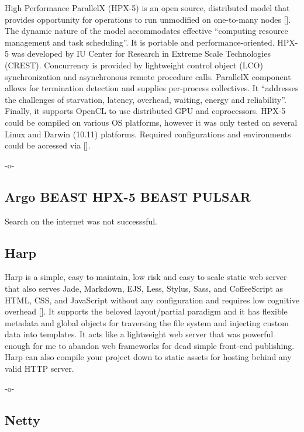 High Performance ParallelX (HPX-5) is an open source, distributed
model that provides opportunity for operations to run unmodified on
one-to-many nodes [\cite{www-hpx-5}].  The dynamic nature of the model
accommodates effective ``computing resource management and task
scheduling''. It is portable and performance-oriented. HPX-5 was
developed by IU Center for Research in Extreme Scale Technologies
(CREST). Concurrency is provided by lightweight control object (LCO)
synchronization and asynchronous remote procedure calls. ParallelX
component allows for termination detection and supplies per-process
collectives. It ``addresses the challenges of starvation, latency,
overhead, waiting, energy and reliability''. Finally, it supports
OpenCL to use distributed GPU and coprocessors. HPX-5 could be
compiled on various OS platforms, however it was only tested on
several Linux and Darwin (10.11) platforms. Required configurations
and environments could be accessed via [\cite{www-hpx-5-user-guide}].

     -o-
   
   
\subsection{Argo BEAST HPX-5 BEAST PULSAR}

     Search on the internet was not successsful.
     
\subsection{Harp}

Harp is a simple, easy to maintain, low risk and easy to scale static
web server that also serves Jade, Markdown, EJS, Less, Stylus, Sass,
and CoffeeScript as HTML, CSS, and JavaScript without any
configuration and requires low cognitive overhead [\cite{www-harp}]. It
supports the beloved layout/partial paradigm and it has flexible
metadata and global objects for traversing the file system and
injecting custom data into templates. It acts like a lightweight web
server that was powerful enough for me to abandon web frameworks for
dead simple front-end publishing. Harp can also compile your project
down to static assets for hosting behind any valid HTTP server.

     -o-
     
\subsection{Netty}

